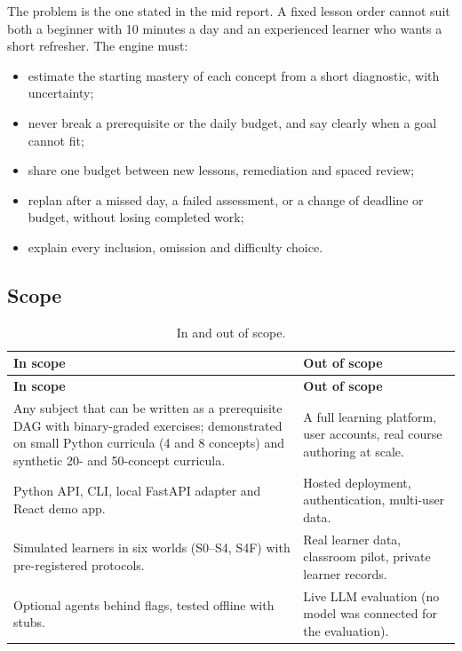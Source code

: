 \documentclass[11pt,a4paper]{article}
\begin{document}
The problem is the one stated in the mid report. A fixed lesson order cannot suit both a beginner with 10 minutes a day and an experienced learner who wants a short refresher. The engine must:
\begin{itemize}
\item estimate the starting mastery of each concept from a short diagnostic, with uncertainty;
\item never break a prerequisite or the daily budget, and say clearly when a goal cannot fit;
\item share one budget between new lessons, remediation and spaced review;
\item replan after a missed day, a failed assessment, or a change of deadline or budget, without losing completed work;
\item explain every inclusion, omission and difficulty choice.
\end{itemize}

\subsection{Scope}

\begin{xltabular}{\textwidth}{
    @{}
    >{\raggedright\arraybackslash}p{0.48\textwidth}
    >{\raggedright\arraybackslash}X
    @{}
}
\caption{In and out of scope.}
\label{tab:scope}\\
\toprule
\textbf{In scope} & \textbf{Out of scope} \\
\midrule
\endfirsthead
\toprule
\textbf{In scope} & \textbf{Out of scope} \\
\midrule
\endhead
\bottomrule
\endfoot
Any subject that can be written as a prerequisite DAG with binary-graded exercises; demonstrated on small Python curricula (4 and 8 concepts) and synthetic 20- and 50-concept curricula. & A full learning platform, user accounts, real course authoring at scale. \\
Python API, CLI, local FastAPI adapter and React demo app. & Hosted deployment, authentication, multi-user data. \\
Simulated learners in six worlds (S0--S4, S4F) with pre-registered protocols. & Real learner data, classroom pilot, private learner records. \\
Optional agents behind flags, tested offline with stubs. & Live LLM evaluation (no model was connected for the evaluation). \\
\end{xltabular}
\end{document}
